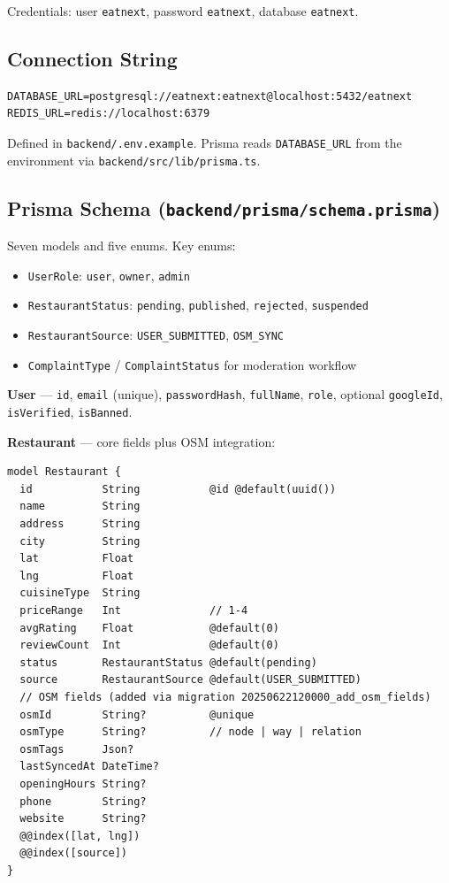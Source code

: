 \documentclass[11pt,a4paper]{article}
\begin{document}
Credentials: user \texttt{eatnext}, password \texttt{eatnext}, database \texttt{eatnext}.

\subsection{Connection String}

\begin{lstlisting}
DATABASE_URL=postgresql://eatnext:eatnext@localhost:5432/eatnext
REDIS_URL=redis://localhost:6379
\end{lstlisting}

Defined in \texttt{backend/.env.example}. Prisma reads \texttt{DATABASE\_URL} from the
environment via \texttt{backend/src/lib/prisma.ts}.

\subsection{Prisma Schema (\texttt{backend/prisma/schema.prisma})}

Seven models and five enums. Key enums:

\begin{itemize}
  \item \texttt{UserRole}: \texttt{user}, \texttt{owner}, \texttt{admin}
  \item \texttt{RestaurantStatus}: \texttt{pending}, \texttt{published}, \texttt{rejected}, \texttt{suspended}
  \item \texttt{RestaurantSource}: \texttt{USER\_SUBMITTED}, \texttt{OSM\_SYNC}
  \item \texttt{ComplaintType} / \texttt{ComplaintStatus} for moderation workflow
\end{itemize}

\textbf{User} --- \texttt{id}, \texttt{email} (unique), \texttt{passwordHash}, \texttt{fullName},
\texttt{role}, optional \texttt{googleId}, \texttt{isVerified}, \texttt{isBanned}.

\textbf{Restaurant} --- core fields plus OSM integration:

\begin{lstlisting}
model Restaurant {
  id           String           @id @default(uuid())
  name         String
  address      String
  city         String
  lat          Float
  lng          Float
  cuisineType  String
  priceRange   Int              // 1-4
  avgRating    Float            @default(0)
  reviewCount  Int              @default(0)
  status       RestaurantStatus @default(pending)
  source       RestaurantSource @default(USER_SUBMITTED)
  // OSM fields (added via migration 20250622120000_add_osm_fields)
  osmId        String?          @unique
  osmType      String?          // node | way | relation
  osmTags      Json?
  lastSyncedAt DateTime?
  openingHours String?
  phone        String?
  website      String?
  @@index([lat, lng])
  @@index([source])
}
\end{lstlisting}
\end{document}
